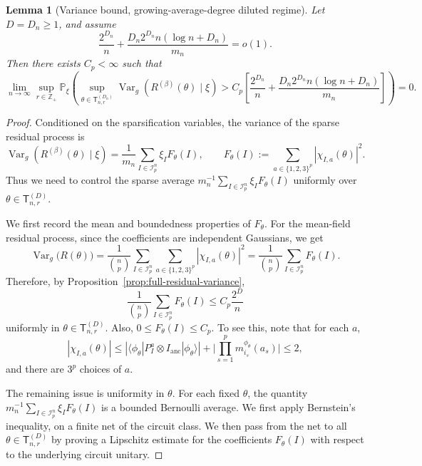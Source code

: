 \documentclass[12pt]{article}
\newtheorem{lemma}[theorem]{Lemma}
\newcommand{\mcI}{\mathcal{I}}
\newcommand{\tvar}{\operatorname{Var}}
\begin{document}
\begin{lemma}[Variance bound, growing-average-degree diluted regime]
\label{lem:sparse-full-residual-variance}
Let \(D=D_n\ge1\), and assume
\[
\frac{2^{D_n}}{n}
+
\frac{D_n2^{D_n}n(\log n+D_n)}{m_n}
=o(1).
\]
Then there exists \(C_p<\infty\) such that
\[
\lim_{n\to\infty}
\sup_{r\in\mathbb Z_+}
\mathbb P_\xi\left(
\sup_{\theta\in\mathsf{T}_{n,r}^{(D_n)}}
\operatorname{Var}_g\!\left(R^{(\beta)}(\theta)\mid \xi\right)
>
C_p
\left[
\frac{2^{D_n}}{n}
+
\frac{D_n2^{D_n}n(\log n+D_n)}{m_n}
\right]
\right)
=0.
\]
\end{lemma}

\begin{proof}
Conditioned on the sparsification variables, the variance of the sparse
residual process is
\[
\tvar_g
(R^{(\beta)}(\theta)\mid \xi)
=
\frac1{m_n}
\sum_{I\in\mcI_p^n}\xi_I F_\theta(I),
\qquad 
F_\theta(I):=\sum_{a\in\{1,2,3\}^p}|\chi_{I,a}(\theta)|^2.
\]
Thus we need to control the sparse average $m_n^{-1}
\sum_{I\in\mcI_p^n}\xi_I F_\theta(I)$ uniformly over \(\theta\in\mathsf{T}_{n,r}^{(D)}\).

We first record the mean and boundedness properties of \(F_\theta\). For the
mean-field residual process, since the coefficients are independent Gaussians, we
get
\[
\tvar_g\bigl(R(\theta)\bigr)
=
\frac1{\binom np}
\sum_{I\in\mcI_p^n}
\sum_{a\in\{1,2,3\}^p}
|\chi_{I,a}(\theta)|^2
=
\frac1{\binom np}
\sum_{I\in\mcI_p^n}
F_\theta(I).
\]
Therefore, by Proposition~\ref{prop:full-residual-variance},
\[
\frac1{\binom np}
\sum_{I\in\mcI_p^n}
F_\theta(I)
\le
C_p\frac{2^D}{n}
\]
uniformly in \(\theta\in\mathsf{T}_{n,r}^{(D)}\). Also,
\(0\le F_\theta(I)\le C_p\). To see this, note that for each \(a\),
\[
|\chi_{I,a}(\theta)|
\le
|\langle\phi_{\theta}|P_I^a\otimes I_{\mathrm{anc}}|\phi_{\theta}\rangle|
+
\big|\prod_{s=1}^p m_{i_s}^{\phi_\theta}(a_s)\big|
\le 2,
\]
and there are \(3^p\) choices of \(a\).

The remaining issue is uniformity in \(\theta\). For each fixed \(\theta\), the
quantity $m_n^{-1}\sum_{I\in\mcI_p^n}\xi_I F_\theta(I)$ is a bounded Bernoulli average. We first apply Bernstein's inequality, on a finite net of the circuit class. We then pass
from the net to all \(\theta\in\mathsf{T}_{n,r}^{(D)}\) by proving a Lipschitz
estimate for the coefficients \(F_\theta(I)\) with respect to the underlying
circuit unitary.


\end{proof}
\end{document}
